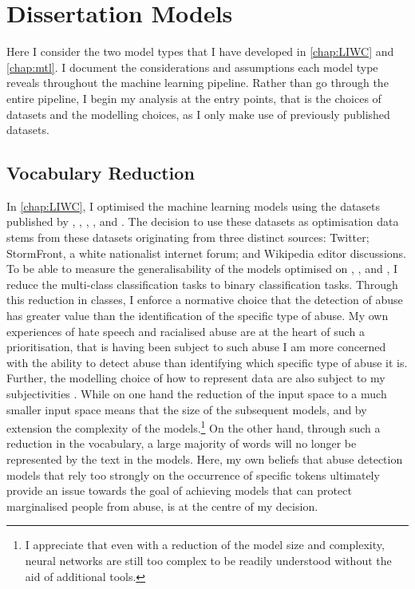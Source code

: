 {\section{Dissertation Models}
Here I consider the two model types that I have developed in \autoref{chap:LIWC} and \autoref{chap:mtl}.
I document the considerations and assumptions each model type reveals throughout the machine learning pipeline.
Rather than go through the entire pipeline, I begin my analysis at the entry points, that is the choices of datasets and the modelling choices, as I only make use of previously published datasets.

\subsection{Vocabulary Reduction}\label{sub:vocab_redux}
In \autoref{chap:LIWC}, I optimised the machine learning models using the datasets published by \citet{Davidson:2017}, \citet{Wulczyn:2016}, \citet{Waseem:2016}, \citet{Waseem-Hovy:2016}, and \citet{Garcia:2018}.
The decision to use these datasets as optimisation data stems from these datasets originating from three distinct sources: Twitter; StormFront, a white nationalist internet forum; and Wikipedia editor discussions.
To be able to measure the generalisability of the models optimised on \citet{Davidson:2017}, \citet{Waseem:2016}, and \citet{Waseem-Hovy:2016}, I reduce the multi-class classification tasks to binary classification tasks.
Through this reduction in classes, I enforce a normative choice that the detection of abuse has greater value than the identification of the specific type of abuse.
My own experiences of hate speech and racialised abuse are at the heart of such a prioritisation, that is having been subject to such abuse I am more concerned with the ability to detect abuse than identifying which specific type of abuse it is.
Further, the modelling choice of how to represent data are also subject to my subjectivities .
While on one hand the reduction of the input space to a much smaller input space means that the size of the subsequent models, and by extension the complexity of the models.\footnote{I appreciate that even with a reduction of the model size and complexity, neural networks are still too complex to be readily understood without the aid of additional tools.}
On the other hand, through such a reduction in the vocabulary, a large majority of words will no longer be represented by the text in the models.
Here, my own beliefs that abuse detection models that rely too strongly on the occurrence of specific tokens ultimately provide an issue towards the goal of achieving models that can protect marginalised people from abuse, is at the centre of my decision.
}
